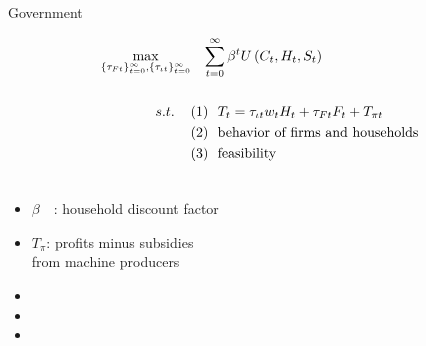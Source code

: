 \documentclass[11pt,aspectratio=169]{beamer}
\begin{document}
\begin{frame}{ Government}
\hypertarget{gov}{}
\vspace{-4mm}
\centering
\begin{minipage}[t!]{1\textwidth}
	\begin{align*}
		\max_{\{\tau_{Ft}\}_{t=0}^{\infty}, \{\tau_{\iota t}\}_{t=0}^{\infty}}&\hspace{3mm} \sum_{t=0}^{\infty}\beta^t U\left(C_t,H_t, S_t\right)\\ \ \\
		{s.t.} \hspace{4mm}
		&{ (1)\ \ T_t=\tau_{\iota t}w_{t}H_{t}+{{\tau_{Ft}}}F_{t}}+T_{\pi t}\\
		& {(2)\ \  \text{behavior of firms and households}}\\
		& {(3)\ \ \text{feasibility} }\\
		& \ %
	\end{align*}
\end{minipage}

\small
\vspace{0mm}
\hspace{-10mm}
\begin{minipage}[t!]{0.5\textwidth}
	\vspace{7mm}
	\begin{itemize}
		\item[] $\beta$\ \ : household discount factor\vspace{-2mm}
		\item[] $T_\pi$: profits minus subsidies \\ \hspace{5.5mm} from machine producers \vspace{0mm}
	\end{itemize}
\end{minipage}
\begin{minipage}[t!]{0.4\textwidth}
	\vspace{8mm}
	\begin{itemize}
		\item[] %
		\vspace{-2mm}	
		\item[] %
		\item[] %
	\end{itemize}
\end{minipage}
\end{frame}
\end{document}
